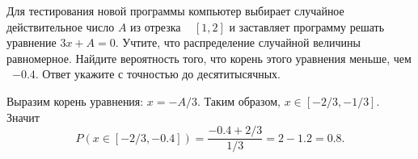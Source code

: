 
Для тестирования новой программы компьютер выбирает случайное действительное число $A$ из отрезка  
$[1, 2]$ и заставляет программу решать уравнение \linebreak $3x + A = 0$. Учтите, что распределение случайной 
величины равномерное. Найдите вероятность того, что корень этого уравнения меньше, чем  $-0.4$. 
Ответ укажите с точностью до десятитысячных.

\soultionSection

Выразим корень уравнения: $x = -A/3$. Таким образом, $x \in [-2/3, -1/3]$. Значит $$P(x \in [-2/3, -0.4]) = \frac{-0.4+2/3}{1/3} = 2 - 1.2 = 0.8.$$

